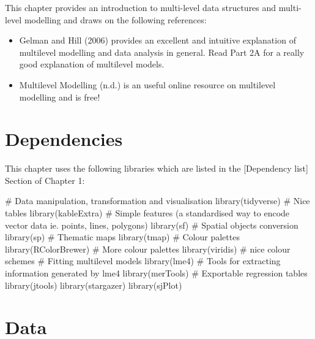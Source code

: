\documentclass[
  letterpaper,
  krantz2]{style/krantz}
\newenvironment{Shaded}{\begin{snugshade}}{\end{snugshade}}
\newcommand{\CommentTok}[1]{\textcolor[rgb]{0.37,0.37,0.37}{#1}}
\newcommand{\FunctionTok}[1]{\textcolor[rgb]{0.28,0.35,0.67}{#1}}
\newcommand{\NormalTok}[1]{\textcolor[rgb]{0.00,0.23,0.31}{#1}}
\providecommand{\tightlist}{%
  \setlength{\itemsep}{0pt}\setlength{\parskip}{0pt}}\usepackage{longtable,booktabs,array}
\begin{document}
This chapter provides an introduction to multi-level data structures and
multi-level modelling and draws on the following references:

\begin{itemize}
\tightlist
\item
  Gelman and Hill (2006) provides an excellent and intuitive explanation
  of multilevel modelling and data analysis in general. Read Part 2A for
  a really good explanation of multilevel models.
\item
  Multilevel Modelling (n.d.) is an useful online resource on multilevel
  modelling and is free!
\end{itemize}

\hypertarget{dependencies-5}{%
\section{Dependencies}\label{dependencies-5}}

This chapter uses the following libraries which are listed in the
{[}Dependency list{]} Section of Chapter 1:

\begin{Shaded}
\begin{Highlighting}[]
\CommentTok{\# Data manipulation, transformation and visualisation}
\FunctionTok{library}\NormalTok{(tidyverse)}
\CommentTok{\# Nice tables}
\FunctionTok{library}\NormalTok{(kableExtra)}
\CommentTok{\# Simple features (a standardised way to encode vector data ie. points, lines, polygons)}
\FunctionTok{library}\NormalTok{(sf) }
\CommentTok{\# Spatial objects conversion}
\FunctionTok{library}\NormalTok{(sp) }
\CommentTok{\# Thematic maps}
\FunctionTok{library}\NormalTok{(tmap) }
\CommentTok{\# Colour palettes}
\FunctionTok{library}\NormalTok{(RColorBrewer) }
\CommentTok{\# More colour palettes}
\FunctionTok{library}\NormalTok{(viridis) }\CommentTok{\# nice colour schemes}
\CommentTok{\# Fitting multilevel models}
\FunctionTok{library}\NormalTok{(lme4)}
\CommentTok{\# Tools for extracting information generated by lme4}
\FunctionTok{library}\NormalTok{(merTools)}
\CommentTok{\# Exportable regression tables}
\FunctionTok{library}\NormalTok{(jtools)}
\FunctionTok{library}\NormalTok{(stargazer)}
\FunctionTok{library}\NormalTok{(sjPlot)}
\end{Highlighting}
\end{Shaded}

\hypertarget{data-4}{%
\section{Data}\label{data-4}}
\end{document}
